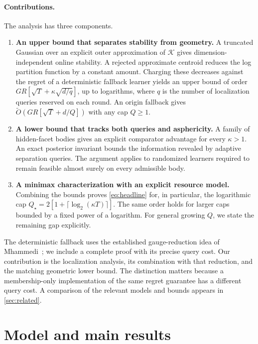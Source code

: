 \documentclass[11pt]{article}
\newcommand{\K}{\mathcal K}
\newcommand{\wtO}{\widetilde O}
\theoremstyle{definition}
\begin{document}
\paragraph{Contributions.}
The analysis has three components.
\begin{enumerate}
 \item \textbf{An upper bound that separates stability from geometry.}
 A truncated Gaussian over an explicit outer approximation of $\K$ gives
 dimension-independent online stability. A rejected approximate centroid
 reduces the log partition function by a constant amount. Charging these
 decreases against the regret of a deterministic fallback learner yields
 an upper bound of order
 $GR[\sqrt T+\kappa\sqrt{d/q}]$, up to logarithms, where $q$ is the number
 of localization queries reserved on each round. An origin fallback gives
 $\wtO(GR[\sqrt T+d/Q])$ with any cap $Q\ge1$.
 \item \textbf{A lower bound that tracks both queries and asphericity.}
 A family of hidden-facet bodies gives an explicit comparator advantage for
 every $\kappa>1$. An exact posterior invariant bounds the information
 revealed by adaptive separation queries. The argument applies to randomized
 learners required to remain feasible almost surely on every admissible body.
 \item \textbf{A minimax characterization with an explicit resource model.}
 Combining the bounds proves \eqref{eq:headline} for, in particular, the
 logarithmic cap $Q_\star=2[1+\lceil\log_2(\kappa T)\rceil]$.
 The same order holds for larger caps bounded by a fixed power of a logarithm.
 For general growing $Q$, we state the remaining gap explicitly.
\end{enumerate}

The deterministic fallback uses the established gauge-reduction idea of
Mhammedi~\cite{mhammedi2022membership,mhammedi2025sep}; we include a complete
proof with its precise query cost. Our contribution is the localization
analysis, its combination with that reduction, and the matching geometric
lower bound. The distinction matters because a membership-only implementation
of the same regret guarantee has a different query cost. A comparison of
the relevant models and bounds appears in \cref{sec:related}.

\section{Model and main results}\label{sec:results}
\end{document}
